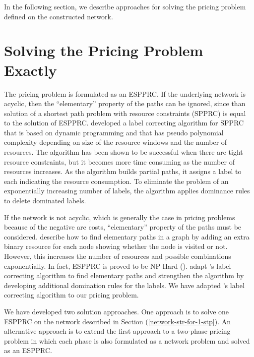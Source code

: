 In the following section, we describe approaches for solving the pricing problem defined on the
constructed network. 

\section {Solving the Pricing Problem Exactly}
\label{solv-pri-exact}
The pricing problem is formulated as an ESPPRC. If the underlying network is acyclic, then
the ``elementary'' property of the paths can be ignored, since than solution of a shortest path 
problem with resource constraints (SPPRC) is equal to the solution of ESPPRC. 
\citet{Desrochers} developed a label correcting algorithm for SPPRC that is based on dynamic 
programming and that has pseudo polynomial complexity depending on size of the resource
windows and the number of resources. The algorithm has been shown to be  successful when there 
are tight resource constraints, but it becomes more time consuming as the number of resources 
increases. As the algorithm builds partial paths, it assigns a label to each 
indicating the resource consumption. To eliminate the problem of an exponentially 
increasing number of labels, the algorithm applies dominance rules to delete dominated labels. 

If the network is not acyclic, which is generally the case in pricing problems because of the 
negative arc costs, ``elementary'' property of the paths must be considered. \citet{Beasley} 
describe how to find elementary paths in a graph by adding an extra binary resource for each 
node showing whether the node is visited or not. However, this increases the number of resources
and possible combinations exponentially. In fact, ESPPRC is proved to be NP-Hard (\citet{Dror}).
\citet{Feillet} adapt \citeauthor{Desrochers}'s label correcting algorithm to find elementary paths 
and strengthen the algorithm by developing additional domination rules for the labels. 
We have adapted \citet{Feillet}'s label correcting algorithm to our pricing problem.

We have developed two solution approaches. One approach is to solve one ESPPRC on the network 
described in Section (\ref{network-str-for-1-stp}). An alternative approach is to extend the
first approach to a two-phase pricing problem in which  each  phase is also formulated as a 
network problem and solved as an ESPPRC. 

